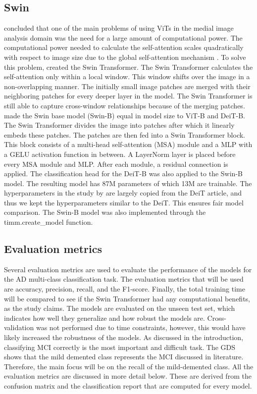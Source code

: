 \documentclass[11pt, a4paper]{article}
\begin{document}
\subsection{Swin} \label{subs:swinmethod}
\cite{He2022TransformersReview} concluded that one of the main problems of using ViTs in the medial image analysis domain was the need for a large amount of computational power. The computational power needed to calculate the self-attention scales quadratically with respect to image size due to the global self-attention mechanism \citep{Dosovitskiy2020AnScale}. To solve this problem, \cite{Liu2021SwinWindows} created the Swin Transformer. The Swin Transformer calculates the self-attention only within a local window. This window shifts over the image in a non-overlapping manner. The initially small image patches are merged with their neighboring patches for every deeper layer in the model. The Swin Transformer is still able to capture cross-window relationships because of the merging patches. \cite{Liu2021SwinWindows} made the Swin base model (Swin-B) equal in model size to ViT-B and DeiT-B. The Swin Transformer divides the image into patches after which it linearly embeds these patches. The patches are then fed into a Swin Transformer block. This block consists of a multi-head self-attention (MSA) module and a MLP with a GELU activation function in between. A LayerNorm layer is placed before every MSA module and MLP. After each module, a residual connection is applied. The classification head for the DeiT-B was also applied to the Swin-B model. The resulting model has 87M parameters of which 13M are trainable. The hyperparameters in the study by \cite{Liu2021SwinWindows} are largely copied from the DeiT article, and thus we kept the hyperparameters similar to the DeiT. This ensures fair model comparison. The Swin-B model was also implemented through the timm.create\_model function.



\subsection{Evaluation metrics} \label{subs:metrics}
Several evaluation metrics are used to evaluate the performance of the models for the AD multi-class classification task. The evaluation metrics that will be used are accuracy, precision, recall, and the F1-score. Finally, the total training time will be compared to see if the Swin Transformer had any computational benefits, as the study claims. The models are evaluated on the unseen test set, which indicates how well they generalize and how robust the models are. Cross-validation was not performed due to time constraints, however, this would have likely increased the robustness of the models. As discussed in the introduction, classifying MCI correctly is the most important and difficult task. The GDS shows that the mild demented class represents the MCI discussed in literature. Therefore, the main focus will be on the recall of the mild-demented class. All the evaluation metrics are discussed in more detail below. These are derived from the confusion matrix and the classification report that are computed for every model. 
\end{document}
